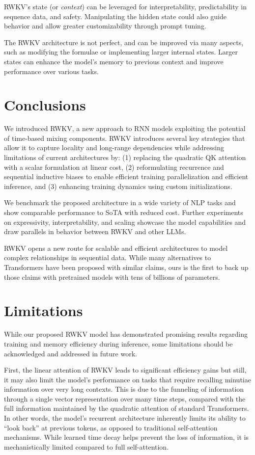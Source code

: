RWKV's state (or \textit{context}) can be leveraged for interpretability, predictability in sequence data, and safety. Manipulating the hidden state could also guide behavior and allow greater customizability through prompt tuning.

The RWKV architecture is not perfect, and can be improved via many aspects, such as modifying the formulae or implementing larger internal states. Larger states can enhance the model's memory to previous context and improve performance over various tasks.

\section{Conclusions} \label{conclusions}

We introduced RWKV, a new approach to RNN models exploiting the potential of time-based mixing components. RWKV introduces several key strategies that allow it to capture locality and long-range dependencies while addressing limitations of current architectures by: (1) replacing the quadratic QK attention with a scalar formulation at linear cost, (2) reformulating recurrence and sequential inductive biases to enable efficient training parallelization and efficient inference, and (3) enhancing training dynamics using custom initializations. 

We benchmark the proposed architecture in a wide variety of NLP tasks and show comparable performance to SoTA with reduced cost. Further experiments on expressivity, interpretability, and scaling showcase the model capabilities and draw parallels in behavior between RWKV and other LLMs. 

RWKV opens a new route for scalable and efficient architectures to model complex relationships in sequential data. While many alternatives to Transformers have been proposed with similar claims, ours is the first to back up those claims with pretrained models with tens of billions of parameters.

\section{Limitations}\label{limitations}
While our proposed RWKV model has demonstrated promising results regarding training and memory efficiency during inference, some limitations should be acknowledged and addressed in future work.

First, the linear attention of RWKV leads to significant efficiency gains but still, it may also limit the model's performance on tasks that require recalling minutiae information over very long contexts. This is due to the funneling of information through a single vector representation over many time steps, compared with the full information maintained by the quadratic attention of standard Transformers. In other words, the model's recurrent architecture inherently limits its ability to ``look back'' at previous tokens, as opposed to traditional self-attention mechanisms. While learned time decay helps prevent the loss of information, it is mechanistically limited compared to full self-attention. 

